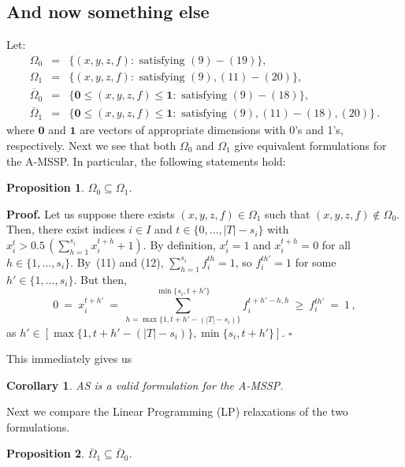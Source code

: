 \documentclass[11pt,twoside]{article}
\newtheorem{Corollary}{Corollary}
\newtheorem{Proposition}{Proposition}
\numberwithin{Theorem}{section}
\numberwithin{Definition}{section}
\numberwithin{Lemma}{section}
\numberwithin{Algorithm}{section}
\numberwithin{equation}{section}
\begin{document}
\subsection{And now something else}

\noindent
Let:
\begin{eqnarray*}
\Omega_0 & = & \{(x,y,z,f): \text{ satisfying } (9)-(19)\}, \\
\Omega_1 & = & \{(x,y,z,f): \text{ satisfying } (9),(11)-(20)\}, \\
\overline{\Omega}_0 & = & \{\textbf{0}\leq (x,y,z,f) \leq \textbf{1}: \text{ satisfying } (9)-(18)\}, \\
\overline{\Omega}_1 & = & \{\textbf{0}\leq (x,y,z,f) \leq \textbf{1}: \text{ satisfying } (9),(11)-(18),(20)\} \,.
\end{eqnarray*}
%
where $\textbf{0}$ and $\textbf{1}$ are vectors of appropriate dimensions with 0's and 1's, respectively.
Next we see that both $\Omega_0$ and $\Omega_1$ give equivalent formulations for the A-MSSP. In particular, the following statements hold:

\begin{Proposition}
$\Omega_0 \subseteq \Omega_1$.
\end{Proposition}

\noindent
\textbf{Proof.}
Let us suppose there exists $(x,y,z,f) \in \Omega_1$ such that $(x,y,z,f) \notin \Omega_0$.
Then, there exist indices $i \in I$ and $t \in \{0,\ldots,|T|-s_i\} $ with $x_i^t > \displaystyle 0.5\,\left( \sum_{h=1}^{s_i} x_i^{t+h} +1\right)$.
By definition, $x_i^t = 1$ and $x_i^{t+h} = 0$ for all $h \in \{1,\dots,s_i\}$. By~(11) and (12), $\displaystyle \sum_{h=1}^{s_i} f_i^{th}=1$, so $f_i^{th'}=1$ for some $h' \in \{1,\dots,s_i\}$.
But then,
\[ 0 \:=\: x_i^{t+h'} \:=\: \sum_{h=\max \{1, t+h'-(|T|-s_i)\}}^{\min\{s_i,t+h'\}} f_i^{t+h'-h,h} \:\ge\: f_i^{th'} \:=\: 1 \,,
\]
as $h' \in [\max \{1, t+h'-(|T|-s_i)\}, \min\{s_i,t+h'\}]$.
\hfill $\square$
\bigskip

\noindent
This immediately gives us
\begin{Corollary}
AS is a valid formulation for the A-MSSP.
\end{Corollary}

\noindent
Next we compare the Linear Programming (LP) relaxations of the two formulations.

\begin{Proposition}
$\overline{\Omega}_1 \subseteq  \overline{\Omega}_0 $.
\end{Proposition}
\end{document}
